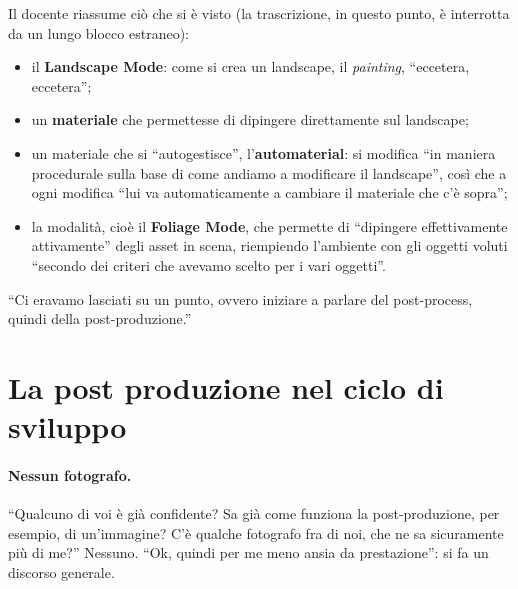 Il docente riassume ciò che si è visto (la trascrizione, in questo punto, è interrotta da un
lungo blocco estraneo):
\begin{itemize}
  \item il \textbf{Landscape Mode}: come si crea un landscape, il \emph{painting},
        ``eccetera, eccetera'';
  \item un \textbf{materiale} che permettesse di dipingere direttamente sul landscape;
  \item un materiale che si ``autogestisce'', l'\textbf{automaterial}: si modifica ``in
        maniera procedurale sulla base di come andiamo a modificare il landscape'', così che
        a ogni modifica ``lui va automaticamente a cambiare il materiale che c'è sopra'';
  \item la modalità, cioè il \textbf{Foliage Mode}, che permette di ``dipingere
        effettivamente attivamente'' degli asset in scena, riempiendo l'ambiente con gli
        oggetti voluti ``secondo dei criteri che avevamo scelto per i vari oggetti''.
\end{itemize}
``Ci eravamo lasciati su un punto, ovvero iniziare a parlare del post-process, quindi della
post-produzione.''

\section{La post produzione nel ciclo di sviluppo}
\label{ue16:sec:produzione}

\paragraph{Nessun fotografo.} ``Qualcuno di voi è già confidente? Sa già come funziona la
post-produzione, per esempio, di un'immagine? C'è qualche fotografo fra di noi, che ne sa
sicuramente più di me?'' Nessuno. ``Ok, quindi per me meno ansia da prestazione'': si fa un
discorso generale.

